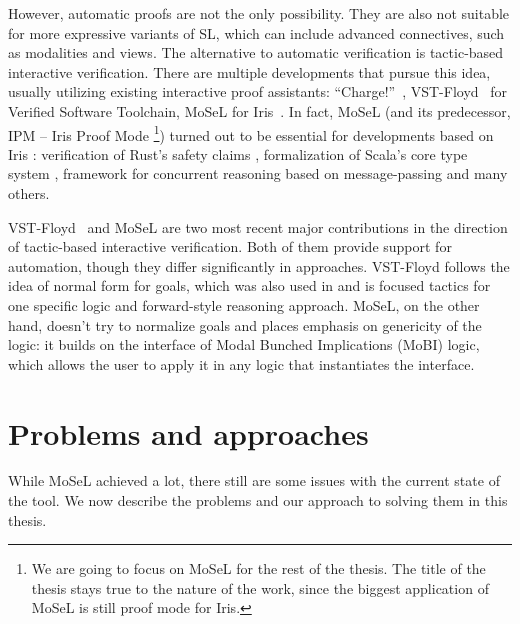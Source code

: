 However, automatic proofs are not the only possibility.
They are also not suitable for more expressive variants of SL, which can include advanced connectives, such as modalities and views.
The alternative to automatic verification is tactic-based interactive verification.
There are multiple developments that pursue this idea, usually utilizing existing interactive proof assistants: ``Charge!''~\cite{bengtsonCharge2012}, VST-Floyd~\cite{caoVSTFloydSeparationLogic2018} for Verified Software Toolchain, MoSeL for Iris~\cite{krebbersInteractiveProofsHigherorder2017, krebbersMoSeLGeneralExtensible2018}.
{
In fact, MoSeL (and its predecessor, IPM -- Iris Proof Mode \footnote{We are going to focus on MoSeL for the rest of the thesis. The title of the thesis stays true to the nature of the work, since the biggest application of MoSeL is still proof mode for Iris.}) turned out to be essential for developments based on Iris \cite{krebbersMoSeLGeneralExtensible2018, jungUnderstandingEvolvingRust2020}: verification of Rust's safety claims \cite{jungRustBeltSecuringFoundations2018, jungStackedBorrowsAliasing2019, dangRustBeltMeetsRelaxed2019}, formalization of Scala's core type system \cite{giarrussoScalaStepbystepSoundness2020}, framework for concurrent reasoning based on message-passing \cite{hinrichsenActrisSessiontypeBased2019} and many others.}

VST-Floyd~\cite{caoVSTFloydSeparationLogic2018} and MoSeL \cite{krebbersMoSeLGeneralExtensible2018} are two most recent major contributions in the direction of tactic-based interactive verification.
Both of them provide support for automation, though they differ significantly in approaches.
VST-Floyd follows the idea of normal form for goals, which was also used in \cite{bengtsonCharge2012} and is focused tactics for one specific logic and forward-style reasoning approach.
MoSeL, on the other hand, doesn't try to normalize goals and places emphasis on genericity of the logic: it builds on the interface of Modal Bunched Implications (MoBI) logic, which allows the user to apply it in any logic that instantiates the interface.

\section{Problems and approaches}
\label{sec:problems-approaches-intro}

While MoSeL achieved a lot, there still are some issues with the current state of the tool.
We now describe the problems and our approach to solving them in this thesis.

